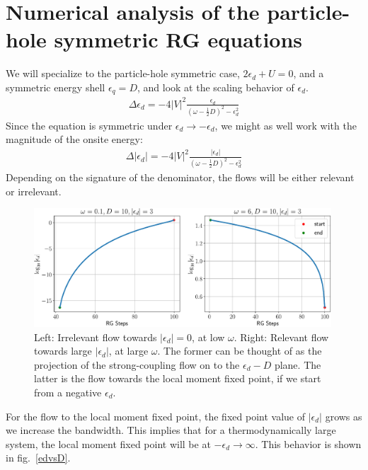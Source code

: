 \section{Numerical analysis of the particle-hole symmetric RG equations}
We will specialize to the particle-hole symmetric case, \(2\epsilon_d + U = 0\), and a symmetric energy shell \(\epsilon_q = D\), and look at the scaling behavior of \(\epsilon_d\).
\begin{equation}\begin{aligned}
	\Delta \epsilon_d = -4|V|^2 \frac{\epsilon_d}{\left( \omega - \frac{1}{2}D \right)^2 - \epsilon_d^2}
\end{aligned}\end{equation}
Since the equation is symmetric under \(\epsilon_d \to -\epsilon_d\), we might as well work with the magnitude of the onsite energy:
\begin{equation}\begin{aligned}
	\Delta |\epsilon_d| = -4|V|^2 \frac{|\epsilon_d|}{\left( \omega - \frac{1}{2}D \right)^2 - \epsilon_d^2}
\end{aligned}\end{equation}
Depending on the signature of the denominator, the flows will be either relevant or irrelevant.
\begin{figure}[!htpb]
	\centering
	\includegraphics[width=0.99\textwidth]{../figures/ed_pure_siam.pdf}
	\caption{Left: Irrelevant flow towards \(|\epsilon_d|=0\), at low \(\omega\). Right: Relevant flow towards large \(|\epsilon_d|\), at large \(\omega\). The former can be thought of as the projection of the strong-coupling flow on to the \(\epsilon_d-D\) plane. The latter is the flow towards the local moment fixed point, if we start from a negative \(\epsilon_d\).}
\end{figure}
For the flow to the local moment fixed point, the fixed point value of \(|\epsilon_d|\) grows as we increase the bandwidth. This implies that for a thermodynamically large system, the local moment fixed point will be at \(-\epsilon_d \to \infty\). This behavior is shown in fig.~\ref{edvsD}.

